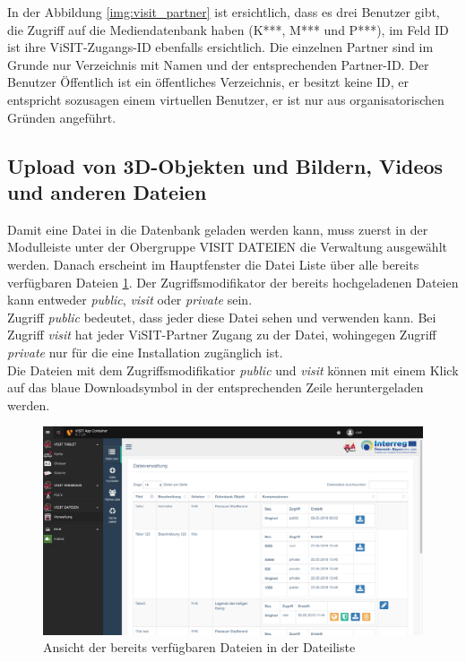 In der Abbildung \ref{img:visit_partner} ist ersichtlich, dass es drei Benutzer gibt, die Zugriff auf die Mediendatenbank haben (K***, M*** und P***), im Feld ID ist ihre ViSIT-Zugangs-ID ebenfalls ersichtlich. Die einzelnen Partner sind im Grunde nur Verzeichnis mit Namen und der entsprechenden Partner-ID. Der Benutzer Öffentlich ist ein öffentliches Verzeichnis, er besitzt keine ID, er entspricht sozusagen einem virtuellen Benutzer, er ist nur aus organisatorischen Gründen angeführt.

\subsection{Upload von 3D-Objekten und Bildern, Videos und anderen Dateien}

Damit eine Datei in die Datenbank geladen werden kann, muss zuerst in der Modulleiste unter der Obergruppe VISIT DATEIEN die Verwaltung ausgewählt werden. Danach erscheint im Hauptfenster die Datei Liste über alle bereits verfügbaren Dateien \ref{img:dateiliste}. Der Zugriffsmodifikator der bereits hochgeladenen Dateien kann entweder \textit{public}, \textit{visit} oder \textit{private} sein.\\
Zugriff \textit{public} bedeutet, dass jeder diese Datei sehen und verwenden kann. Bei Zugriff \textit{visit} hat jeder ViSIT-Partner Zugang zu der Datei, wohingegen Zugriff \textit{private} nur für die eine Installation zugänglich ist.\\
Die Dateien mit dem Zugriffsmodifikatior \textit{public} und \textit{visit} können mit einem Klick auf das blaue Downloadsymbol in der entsprechenden Zeile heruntergeladen werden.

\begin{figure}[ht!]
\centering
\includegraphics[width=12cm]{Figures/paula/dateiverwaltung/dateiliste.png}
\caption{Ansicht der bereits verfügbaren Dateien in der Dateiliste}
\label{img:dateiliste}
\end{figure}

